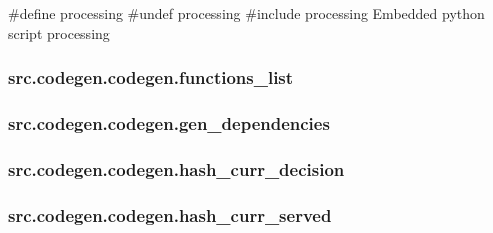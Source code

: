 \#define processing \#undef processing \#include processing Embedded python script processing \hypertarget{classsrc_1_1codegen_1_1codegen_aadf9a8ccf3c2cfbe223263585df2c595}{
\subsubsection[{functions\-\_\-list}]{\setlength{\rightskip}{0pt plus 5cm}src.\-codegen.\-codegen.\-functions\-\_\-list}}\label{classsrc_1_1codegen_1_1codegen_aadf9a8ccf3c2cfbe223263585df2c595}
\hypertarget{classsrc_1_1codegen_1_1codegen_af63c5fcc7e7d1d62c3d7860151e68e4c}{
\subsubsection[{gen\-\_\-dependencies}]{\setlength{\rightskip}{0pt plus 5cm}src.\-codegen.\-codegen.\-gen\-\_\-dependencies}}\label{classsrc_1_1codegen_1_1codegen_af63c5fcc7e7d1d62c3d7860151e68e4c}
\hypertarget{classsrc_1_1codegen_1_1codegen_acd0bbf5623e10244e004795c4d6c9864}{
\subsubsection[{hash\-\_\-curr\-\_\-decision}]{\setlength{\rightskip}{0pt plus 5cm}src.\-codegen.\-codegen.\-hash\-\_\-curr\-\_\-decision}}\label{classsrc_1_1codegen_1_1codegen_acd0bbf5623e10244e004795c4d6c9864}
\hypertarget{classsrc_1_1codegen_1_1codegen_a4694bff348e2ec720f070f5a00a7627b}{
\subsubsection[{hash\-\_\-curr\-\_\-served}]{\setlength{\rightskip}{0pt plus 5cm}src.\-codegen.\-codegen.\-hash\-\_\-curr\-\_\-served}}\label{classsrc_1_1codegen_1_1codegen_a4694bff348e2ec720f070f5a00a7627b}
